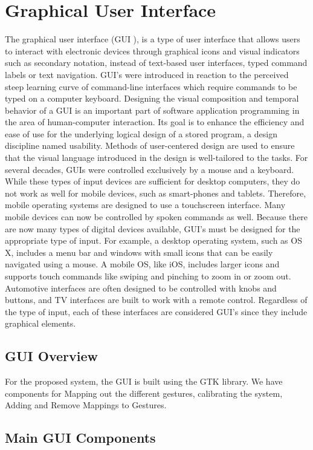 \documentclass[11pt]{report}
\begin{document}
\chapter{Graphical User Interface}
The graphical user interface (GUI ), is a type of user interface that allows users to interact with
electronic devices through graphical icons and visual indicators such as secondary notation, instead
of text-based user interfaces, typed command labels or text navigation. GUI's were introduced in
reaction to the perceived steep learning curve of command-line interfaces which require commands
to be typed on a computer keyboard.
Designing the visual composition and temporal behavior of a GUI is an important part of
software application programming in the area of human-computer interaction. Its goal is to enhance
the efficiency and ease of use for the underlying logical design of a stored program, a design discipline
named usability. Methods of user-centered design are used to ensure that the visual language
introduced in the design is well-tailored to the tasks.
For several decades, GUIs were controlled exclusively by a mouse and a keyboard. While these
types of input devices are sufficient for desktop computers, they do not work as well for mobile
devices, such as smart-phones and tablets. Therefore, mobile operating systems are designed to use
a touchscreen interface. Many mobile devices can now be controlled by spoken commands as well.
Because there are now many types of digital devices available, GUI's must be designed for the
appropriate type of input. For example, a desktop operating system, such as OS X, includes a
menu bar and windows with small icons that can be easily navigated using a mouse. A mobile OS,
like iOS, includes larger icons and supports touch commands like swiping and pinching to zoom in
or zoom out. Automotive interfaces are often designed to be controlled with knobs and buttons,
and TV interfaces are built to work with a remote control. Regardless of the type of input, each of
these interfaces are considered GUI's since they include graphical elements.
\section{GUI Overview}

For the proposed system, the GUI is built using the GTK library. We have components for Mapping out the 
different gestures, calibrating the system, Adding and Remove Mappings to Gestures.  

\section{Main GUI Components}
\end{document}
